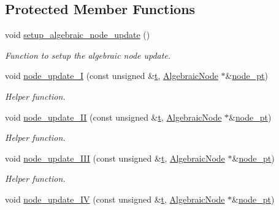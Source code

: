\subsection*{Protected Member Functions}
\begin{DoxyCompactItemize}
\item 
void \hyperlink{classoomph_1_1AlgebraicCylinderWithFlagMesh_ad6af2e420e0f152a7fb055f25400a5d0}{setup\+\_\+algebraic\+\_\+node\+\_\+update} ()
\begin{DoxyCompactList}\small\item\em Function to setup the algebraic node update. \end{DoxyCompactList}\item 
void \hyperlink{classoomph_1_1AlgebraicCylinderWithFlagMesh_a713cf7c2e1be91eae2667dc3e1fd8644}{node\+\_\+update\+\_\+I} (const unsigned \&\hyperlink{cfortran_8h_af6f0bd3dc13317f895c91323c25c2b8f}{t}, \hyperlink{classoomph_1_1AlgebraicNode}{Algebraic\+Node} $\ast$\&\hyperlink{classoomph_1_1AlgebraicMesh_aedeebbe95d2f8e67e9939cecd1be3933}{node\+\_\+pt})
\begin{DoxyCompactList}\small\item\em Helper function. \end{DoxyCompactList}\item 
void \hyperlink{classoomph_1_1AlgebraicCylinderWithFlagMesh_a2717b4ae70a9641c24becc8176410b3e}{node\+\_\+update\+\_\+\+II} (const unsigned \&\hyperlink{cfortran_8h_af6f0bd3dc13317f895c91323c25c2b8f}{t}, \hyperlink{classoomph_1_1AlgebraicNode}{Algebraic\+Node} $\ast$\&\hyperlink{classoomph_1_1AlgebraicMesh_aedeebbe95d2f8e67e9939cecd1be3933}{node\+\_\+pt})
\begin{DoxyCompactList}\small\item\em Helper function. \end{DoxyCompactList}\item 
void \hyperlink{classoomph_1_1AlgebraicCylinderWithFlagMesh_a3e8c71cc3ab123864b4f999e612345ee}{node\+\_\+update\+\_\+\+I\+II} (const unsigned \&\hyperlink{cfortran_8h_af6f0bd3dc13317f895c91323c25c2b8f}{t}, \hyperlink{classoomph_1_1AlgebraicNode}{Algebraic\+Node} $\ast$\&\hyperlink{classoomph_1_1AlgebraicMesh_aedeebbe95d2f8e67e9939cecd1be3933}{node\+\_\+pt})
\begin{DoxyCompactList}\small\item\em Helper function. \end{DoxyCompactList}\item 
void \hyperlink{classoomph_1_1AlgebraicCylinderWithFlagMesh_a69ab465aa28dd9a65a0c50762c0a6d89}{node\+\_\+update\+\_\+\+IV} (const unsigned \&\hyperlink{cfortran_8h_af6f0bd3dc13317f895c91323c25c2b8f}{t}, \hyperlink{classoomph_1_1AlgebraicNode}{Algebraic\+Node} $\ast$\&\hyperlink{classoomph_1_1AlgebraicMesh_aedeebbe95d2f8e67e9939cecd1be3933}{node\+\_\+pt})

\end{DoxyCompactItemize}

